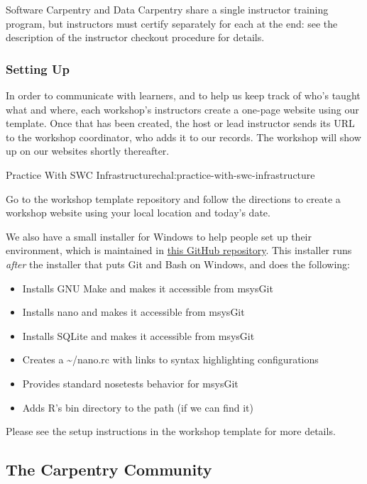 Software Carpentry and Data Carpentry share a single instructor training
program, but instructors must certify separately for each at the end:
see the description of the
instructor checkout procedure for details.

\subsubsection{Setting Up}\label{setting-up}

In order to communicate with learners, and to help us keep track of
who's taught what and where, each workshop's instructors create a
one-page website using our template. Once that has been created, the host or lead instructor sends
its URL to the workshop coordinator, who adds it to our records. The workshop will show up on
our websites shortly thereafter.

\begin{challenge}{Practice With SWC Infrastructure}{chal:practice-with-swc-infrastructure}

Go to the workshop template repository and follow the directions to create a workshop website using
your local location and today's date.
\end{challenge}

We also have
a small installer for Windows to help people set up their environment,
which is maintained in
\href{https://github.com/swcarpentry/windows-installer}{this GitHub
repository}. This installer runs \emph{after} the installer that puts
Git and Bash on Windows, and does the following:

\begin{itemize}
\item
  Installs GNU Make and makes it accessible from msysGit
\item
  Installs nano and makes it accessible from msysGit
\item
  Installs SQLite and makes it accessible from msysGit
\item
  Creates a \textasciitilde{}/nano.rc with links to syntax highlighting
  configurations
\item
  Provides standard nosetests behavior for msysGit
\item
  Adds R's bin directory to the path (if we can find it)
\end{itemize}

Please see the setup instructions in the workshop template for more
details.

\subsection{The Carpentry Community}\label{the-carpentry-community}

